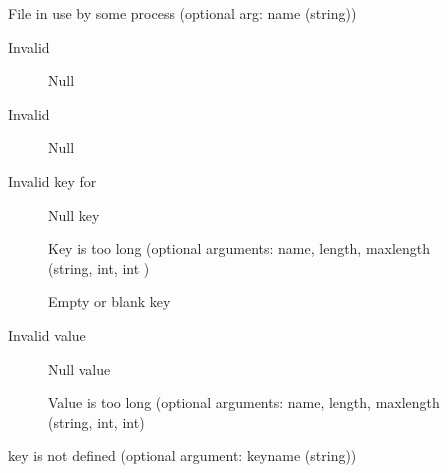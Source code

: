 \begin{description}
\item[]File in use by some process (optional
  arg: name (string))
\item[]Invalid 
    \begin{description}
    \item[]Null 
    \end{description}
\item[]Invalid 
    \begin{description}
    \item[]Null 
    \end{description}
\item[]Invalid key for 
    \begin{description}
    \item[]Null key
    \item[]Key is too long (optional
      arguments: name, length, maxlength (string, int, int )
    \item[]Empty or blank key
    \end{description}
\item[]Invalid  value
    \begin{description}
    \item[]Null value
    \item[]Value is too long (optional
      arguments: name, length, maxlength (string, int, int)
    \end{description}
\item[] key is not defined
  (optional argument: keyname (string))

\end{description}
